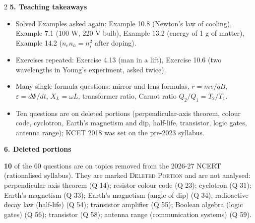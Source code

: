 \begin{multicols}{2}
\textbf{\color{crimson}5. Teaching takeaways}\par\smallskip
{\footnotesize\begin{itemize}[leftmargin=1em,nosep]
\item Solved Examples asked again: Example 10.8 (Newton's law of cooling), Example 7.1 (100 W, 220 V bulb), Example 13.2 (energy of 1 g of matter), Example 14.2 ($n_en_h=n_i^2$ after doping).
\item Exercises repeated: Exercise 4.13 (man in a lift), Exercise 10.6 (two wavelengths in Young's experiment, asked twice).
\item Many single-formula questions: mirror and lens formulas, $r=mv/qB$, $\varepsilon=d\Phi/dt$, $X_L=\omega L$, transformer ratio, Carnot ratio $Q_2/Q_1=T_2/T_1$.
\item Ten questions are on deleted portions (perpendicular-axis theorem, colour code, cyclotron, Earth's magnetism and dip, half-life, transistor, logic gates, antenna range); KCET 2018 was set on the pre-2023 syllabus.
\end{itemize}}\par\medskip
\textbf{\color{crimson}6. Deleted portions}\par\smallskip
\textbf{10} of the 60 questions are on topics removed from the 2026-27 NCERT (rationalised syllabus). They are marked \textsc{Deleted Portion} and are not analysed: perpendicular axis theorem (Q 14); resistor colour code (Q 23); cyclotron (Q 31); Earth's magnetism (Q 33); Earth's magnetism (angle of dip) (Q 34); radioactive decay law (half-life) (Q 54); transistor amplifier (Q 55); Boolean algebra (logic gates) (Q 56); transistor (Q 58); antenna range (communication systems) (Q 59).\par
\end{multicols}







